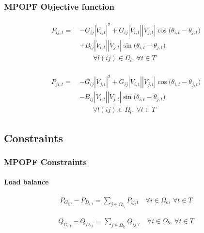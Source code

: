 \documentclass[
	11pt, %
	aspectratio=169, %
]{beamer}
\begin{document}

\begin{frame}
	\frametitle{MPOPF Objective function}

	\begin{align}
	\label{eq:Mexpr_p_flow_ij}
		\begin{split}
		P_{ij,t} =\ &-G_{ij} \left|\dot{V}_{i,t}\right|^2 
		+ G_{ij} \left|\dot{V}_{i,t}\right|\left|\dot{V}_{j,t}\right| \cos\big(\theta_{i,t}-\theta_{j,t}\big) \\
		&+ B_{ij} \left|\dot{V}_{i,t}\right|\left|\dot{V}_{j,t}\right| \sin\big(\theta_{i,t}-\theta_{j,t}\big) \\[1em]
		&\qquad \forall l(ij) \in \Omega_{l},\ \forall t \in T
		\end{split}
	\end{align}

	\begin{align}
	\label{eq:Mexpr_p_flow_ji}
		\begin{split}
		P_{ji,t} =\ &-G_{ij} \left|\dot{V}_{j,t}\right|^2 
		+ G_{ij} \left|\dot{V}_{i,t}\right|\left|\dot{V}_{j,t}\right| \cos\big(\theta_{i,t}-\theta_{j,t}\big) \\
		&- B_{ij} \left|\dot{V}_{i,t}\right|\left|\dot{V}_{j,t}\right| \sin\big(\theta_{i,t}-\theta_{j,t}\big) \\[1em]
		&\qquad \forall l(ij) \in \Omega_{l},\ \forall t \in T
		\end{split}
	\end{align}

\end{frame}


\subsection{Constraints}

\begin{frame}
	\frametitle{MPOPF Constraints}
	\label{frame:MPOFP_constraints}
	\framesubtitle{Load balance} %

	\begin{align}
	\label{eq:Mcons_load_bal_P}
		P_{G_{i,t}} - P_{D_{i,t}} = \sum_{j \in \Omega_{b_{i}}} P_{ij,t}  \quad \forall i \in \Omega_{b},\ \forall t \in T
	\end{align}

	\begin{align}
	\label{eq:Mcons_load_bal_Q}
		Q_{G_{i,t}} - Q_{D_{i,t}} = \sum_{j \in \Omega_{b_{i}}} Q_{ij,t}  \quad \forall i \in \Omega_{b},\ \forall t \in T
	\end{align}

\end{frame}
\end{document}
